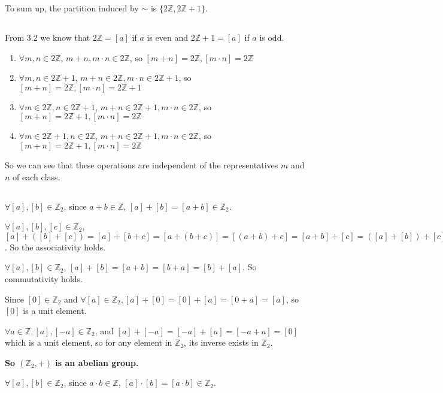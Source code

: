 \documentclass[a4paper,12pt,titlepage]{article}
\begin{document}
To sum up, the partition induced by $\sim$ is $\lbrace2\mathbb{Z}, 2\mathbb{Z}+1 \rbrace$.

\subsection{}
From 3.2 we know that $2\mathbb{Z}=[a]$ if $a$ is even and $2\mathbb{Z}+1=[a]$ if $a$ is odd. 
\begin{enumerate}
\item $\forall m,n\in 2\mathbb{Z}$, $m+n,m\cdot n\in2\mathbb{Z}$, so $[m+n]=2\mathbb{Z},[m\cdot n]=2\mathbb{Z}$
\item $\forall m,n\in 2\mathbb{Z}+1$, $m+n\in2\mathbb{Z},m\cdot n\in2\mathbb{Z}+1$, so $[m+n]=2\mathbb{Z},[m\cdot n]=2\mathbb{Z}+1$
\item $\forall m\in2\mathbb{Z},n\in 2\mathbb{Z}+1$, $m+n\in2\mathbb{Z}+1,m\cdot n\in2\mathbb{Z}$, so $[m+n]=2\mathbb{Z}+1,[m\cdot n]=2\mathbb{Z}$
\item $\forall m\in2\mathbb{Z}+1,n\in 2\mathbb{Z}$, $m+n\in2\mathbb{Z}+1,m\cdot n\in2\mathbb{Z}$, so $[m+n]=2\mathbb{Z}+1,[m\cdot n]=2\mathbb{Z}$
\end{enumerate}

So we can see that these operations are  independent of the representatives $m$ and $n$ of each class.

\subsection{}
$\forall [a],[b]\in \mathbb{Z}_2$, since $a+b\in\mathbb{Z}$, $[a]+[b]=[a+ b]\in \mathbb{Z}_2$.

$\forall [a],[b],[c]\in \mathbb{Z}_2$, $[a]+([b]+ [c])=[a]+[b+c]=[a+(b+c)]=[(a+b)+c]=[a+b]+[c]=([a]+ [b])+ [c]$. So the associativity holds.

$\forall [a],[b]\in \mathbb{Z}_2$, $[a]+[b]=[a+ b]=[b+a]=[b]+[a]$. So commutativity holds.
 
Since $[0]\in\mathbb{Z}_2$ and $\forall [a]\in\mathbb{Z}_2,[a]+[0]=[0]+[a]=[0+a]=[a]$, so $[0]$ is a unit element.

$\forall a\in \mathbb{Z}, [a],[-a]\in\mathbb{Z}_2$, and $[a]+[-a]=[-a]+[a]=[-a+a]=[0]$ which is a unit element, so for any element in $\mathbb{Z}_2$, its inverse exists in $\mathbb{Z}_2$.

\textbf{So $(\mathbb{Z}_2,+)$ is an abelian group.}  

$\forall [a],[b]\in \mathbb{Z}_2$, since $a\cdot b\in\mathbb{Z}$, $[a]\cdot[b]=[a\cdot b]\in \mathbb{Z}_2$.
\end{document}
